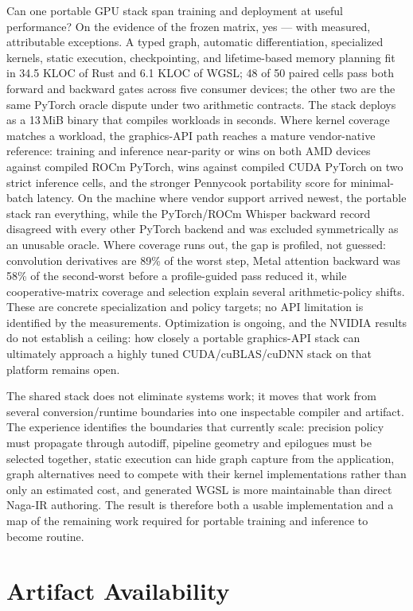 \documentclass[10pt,twocolumn]{article}
\begin{document}
Can one portable GPU stack span training and deployment at useful
performance? On the evidence of the frozen matrix, yes --- with measured,
attributable exceptions. A typed graph, automatic differentiation,
specialized kernels, static execution, checkpointing, and lifetime-based
memory planning fit in 34.5 KLOC of Rust and 6.1 KLOC of WGSL; 48 of 50
paired cells pass both forward and backward gates across five consumer
devices; the other two are the same PyTorch oracle dispute under two
arithmetic contracts. The stack deploys as a 13\,MiB binary that compiles workloads in
seconds. Where kernel
coverage matches a workload, the graphics-API path reaches a mature
vendor-native reference: training and inference near-parity or wins on both
AMD devices against compiled ROCm PyTorch, wins against compiled CUDA
PyTorch on two strict inference cells, and the stronger Pennycook
portability score for minimal-batch latency. On the machine where vendor
support arrived newest, the portable stack ran everything, while the
PyTorch/ROCm Whisper backward record disagreed with every other PyTorch
backend and was excluded symmetrically as an unusable oracle. Where coverage runs out,
the gap is profiled, not guessed: convolution derivatives are 89\% of the
worst step, Metal attention backward was 58\% of the second-worst before a
profile-guided pass reduced it, while cooperative-matrix coverage and
selection explain several arithmetic-policy shifts. These are concrete
specialization and policy targets; no API limitation is identified by the
measurements. Optimization is ongoing, and the NVIDIA results do not establish
a ceiling: how closely a portable graphics-API stack can ultimately approach
a highly tuned CUDA/cuBLAS/cuDNN stack on that platform remains open.

The shared stack does not eliminate systems work; it moves that work from
several conversion/runtime boundaries into one inspectable compiler and
artifact. The experience identifies the boundaries that currently scale:
precision policy must propagate through autodiff, pipeline geometry and
epilogues must be selected together, static execution can hide graph capture
from the application, graph alternatives need to compete with their kernel
implementations rather than only an estimated cost, and generated WGSL is more
maintainable than direct Naga-IR authoring. The result is therefore both a
usable implementation and a map of the remaining work required for portable
training and inference to become routine.

\section*{Artifact Availability}
\end{document}
